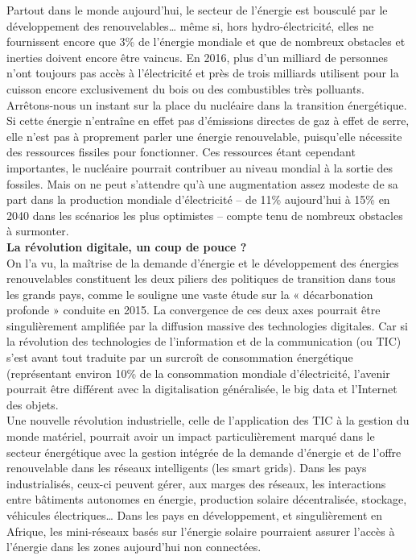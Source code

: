 \documentclass[8pt]{article}
\begin{document}
Partout dans le monde aujourd’hui, le secteur de l’énergie est bousculé par le développement des renouvelables… même si, hors hydro-électricité, elles ne fournissent encore que 3\% de l’énergie mondiale et que de nombreux obstacles et inerties doivent encore être vaincus. En 2016, plus d’un milliard de personnes n’ont toujours pas accès à l’électricité et près de trois milliards utilisent pour la cuisson encore exclusivement du bois ou des combustibles très polluants. \\


Arrêtons-nous un instant sur la place du nucléaire dans la transition énergétique. Si cette énergie n’entraîne en effet pas d’émissions directes de gaz à effet de serre, elle n’est pas à proprement parler une énergie renouvelable, puisqu’elle nécessite des ressources fissiles pour fonctionner. Ces ressources étant cependant importantes, le nucléaire pourrait contribuer au niveau mondial à la sortie des fossiles. Mais on ne peut s’attendre qu’à une augmentation assez modeste de sa part dans la production mondiale d’électricité – de 11\% aujourd’hui à 15\% en 2040 dans les scénarios les plus optimistes – compte tenu de nombreux obstacles à surmonter.\\

\textbf{La révolution digitale, un coup de pouce ?}\\

On l’a vu, la maîtrise de la demande d’énergie et le développement des énergies renouvelables constituent les deux piliers des politiques de transition dans tous les grands pays, comme le souligne une vaste étude sur la « décarbonation profonde » conduite en 2015.
La convergence de ces deux axes pourrait être singulièrement amplifiée par la diffusion massive des technologies digitales. Car si la révolution des technologies de l’information et de la communication (ou TIC) s’est avant tout traduite par un surcroît de consommation énergétique (représentant environ 10\% de la consommation mondiale d’électricité, l’avenir pourrait être différent avec la digitalisation généralisée, le big data et l’Internet des objets.\\


Une nouvelle révolution industrielle, celle de l’application des TIC à la gestion du monde matériel, pourrait avoir un impact particulièrement marqué dans le secteur énergétique avec la gestion intégrée de la demande d’énergie et de l’offre renouvelable dans les réseaux intelligents (les smart grids).
Dans les pays industrialisés, ceux-ci peuvent gérer, aux marges des réseaux, les interactions entre bâtiments autonomes en énergie, production solaire décentralisée, stockage, véhicules électriques… Dans les pays en développement, et singulièrement en Afrique, les mini-réseaux basés sur l’énergie solaire pourraient assurer l’accès à l’énergie dans les zones aujourd’hui non connectées.\\
\end{document}
